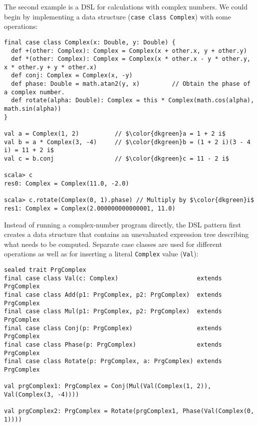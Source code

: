 The second example is a DSL for calculations with complex numbers.
We could begin by implementing a data structure (\lstinline!case class Complex!)
with some operations: 
\begin{lstlisting}[mathescape=true]
final case class Complex(x: Double, y: Double) {
  def +(other: Complex): Complex = Complex(x + other.x, y + other.y)
  def *(other: Complex): Complex = Complex(x * other.x - y * other.y, x * other.y + y * other.x)
  def conj: Complex = Complex(x, -y)
  def phase: Double = math.atan2(y, x)         // Obtain the phase of a complex number.
  def rotate(alpha: Double): Complex = this * Complex(math.cos(alpha), math.sin(alpha))
}

val a = Complex(1, 2)          // $\color{dkgreen}a = 1 + 2 i$
val b = a * Complex(3, -4)     // $\color{dkgreen}b = (1 + 2 i)(3 - 4 i) = 11 + 2 i$
val c = b.conj                 // $\color{dkgreen}c = 11 - 2 i$

scala> c
res0: Complex = Complex(11.0, -2.0)

scala> c.rotate(Complex(0, 1).phase) // Multiply by $\color{dkgreen}i$
res1: Complex = Complex(2.000000000000001, 11.0)
\end{lstlisting}
Instead of running a complex-number program directly, the DSL pattern
first creates a data structure that contains an unevaluated expression
tree describing what needs to be computed. Separate case classes are
used for different operations as well as for inserting a literal \lstinline!Complex!
value (\lstinline!Val!):
\begin{lstlisting}
sealed trait PrgComplex
final case class Val(c: Complex)                      extends PrgComplex
final case class Add(p1: PrgComplex, p2: PrgComplex)  extends PrgComplex
final case class Mul(p1: PrgComplex, p2: PrgComplex)  extends PrgComplex
final case class Conj(p: PrgComplex)                  extends PrgComplex
final case class Phase(p: PrgComplex)                 extends PrgComplex
final case class Rotate(p: PrgComplex, a: PrgComplex) extends PrgComplex

val prgComplex1: PrgComplex = Conj(Mul(Val(Complex(1, 2)), Val(Complex(3, -4))))

val prgComplex2: PrgComplex = Rotate(prgComplex1, Phase(Val(Complex(0, 1))))
\end{lstlisting}
